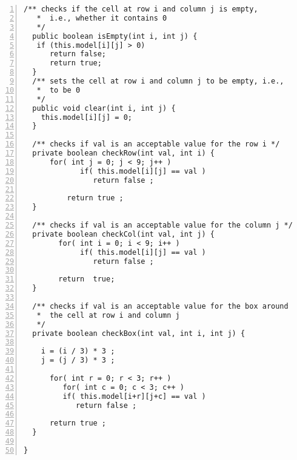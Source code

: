 \documentclass{article}
\begin{document}
\begin{lstlisting}[language=Tex,
basicstyle=\footnotesize\ttfamily,
numbers=left,stepnumber=1, 
morekeywords={assert},
tabsize=4,
breaklines=true]
  /** checks if the cell at row i and column j is empty,
   *  i.e., whether it contains 0
   */
  public boolean isEmpty(int i, int j) {
   if (this.model[i][j] > 0)
      return false;
   	  return true;
  }
  /** sets the cell at row i and column j to be empty, i.e.,
   *  to be 0
   */
  public void clear(int i, int j) {
    this.model[i][j] = 0;
  }

  /** checks if val is an acceptable value for the row i */
  private boolean checkRow(int val, int i) {
	  for( int j = 0; j < 9; j++ )
	         if( this.model[i][j] == val )
	            return false ;

	      return true ;
  }

  /** checks if val is an acceptable value for the column j */
  private boolean checkCol(int val, int j) {
	    for( int i = 0; i < 9; i++ )
	         if( this.model[i][j] == val )
	            return false ;
	    
	    return  true;
  }

  /** checks if val is an acceptable value for the box around
   *  the cell at row i and column j
   */
  private boolean checkBox(int val, int i, int j) {
      
	i = (i / 3) * 3 ;
    j = (j / 3) * 3 ;

      for( int r = 0; r < 3; r++ )
         for( int c = 0; c < 3; c++ )
         if( this.model[i+r][j+c] == val )
            return false ;

      return true ;
  }

}
\end{lstlisting}
\end{document}
